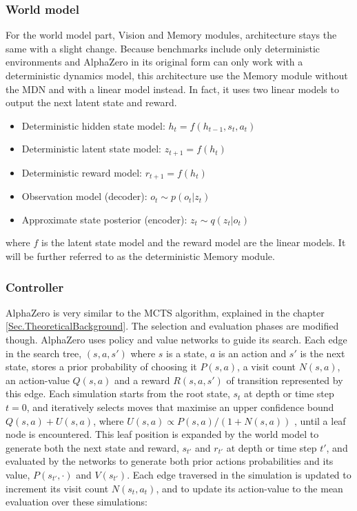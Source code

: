 \subsubsection{World model}

For the world model part, Vision and Memory modules, architecture stays the same with a slight change. Because benchmarks include only deterministic environments and AlphaZero in its original form can only work with a deterministic dynamics model, this architecture use the Memory module without the MDN and with a linear model instead. In fact, it uses two linear models to output the next latent state and reward.
\begin{itemize}
\item Deterministic hidden state model:      $h_t = f(h_{t-1}, s_{t}, a_{t})$
\item Deterministic latent state model:      $z_{t+1} = f(h_t)$
\item Deterministic reward model:            $r_{t+1} = f(h_t)$
\item Observation model (decoder):           $o_t \sim p(o_t|z_t)$
\item Approximate state posterior (encoder): $z_t \sim q(z_t|o_t)$
\end{itemize}
where $f$ is the latent state model and the reward model are the linear models. It will be further referred to as the deterministic Memory module.

\subsubsection{Controller}

AlphaZero \cite{Algo.AlphaZero} is very similar to the MCTS algorithm, explained in the chapter \ref{Sec.TheoreticalBackground}. The selection and evaluation phases are modified though. AlphaZero uses policy and value networks to guide its search. Each edge in the search tree, $(s, a, s')$ where $s$ is a state, $a$ is an action and $s'$ is the next state, stores a prior probability of choosing it $P(s, a)$, a visit count $N(s, a)$, an action-value $Q(s, a)$ and a reward $R(s, a, s')$ of transition represented by this edge. Each simulation starts from the root state, $s_t$ at depth or time step $t=0$, and iteratively selects moves that maximise an upper confidence bound $Q(s, a) + U(s, a)$, where $U(s, a) \propto P(s, a)/(1+ N(s, a))$ \cite{Algo.AlphaGoZero}, until a leaf node is encountered. This leaf position is expanded by the world model to generate both the next state and reward, $s_{t'}$ and $r_{t'}$ at depth or time step $t'$, and evaluated by the networks to generate both prior actions probabilities and its value, $P(s_{t'}, \cdot)$ and $V(s_{t'})$. Each edge traversed in the simulation is updated to increment its visit count $N(s_t, a_t)$, and to update its action-value to the mean evaluation over these simulations:

